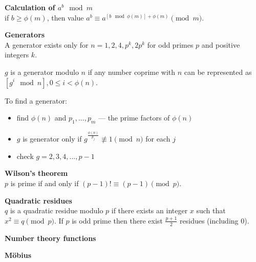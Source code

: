 \textbf{Calculation of $a^b \mod m$}\\
if $b \ge \phi(m)$, then value $a^b \equiv a^{\left[b \mod \phi(m)\right] + \phi(m)} \pmod m$.

\textbf{Generators}\\
A generator exists only for $n = 1, 2, 4, p^k, 2p^k$ for odd primes $p$ and positive integers $k$. 

$g$ is a generator modulo $n$ if any number coprime with $n$ can be represented as $\left[ g^i \mod n \right], 0 \le i < \phi(n)$.

To find a generator:
\begin{itemize}
\item find $\phi(n)$ and $p_1, ..., p_m$ --- the prime factors of $\phi(n)$
\item $g$ is generator only if $g^{\frac{\phi(n)}{p_j}} \not\equiv 1 \pmod n$ for each $j$
\item check $g = 2, 3, 4, ..., p - 1$
\end{itemize}

\textbf{Wilson's theorem}\\
$p$ is prime if and only if $(p - 1)! \equiv (p - 1) \pmod p$.

\textbf{Quadratic residues}\\
$q$ is a quadratic residue modulo $p$ if there exists an integer $x$ such that $x^2 \equiv q \pmod p$.
If $p$ is odd prime then there exist $\frac{p + 1}{2}$ residues (including 0).

\textbf{Number theory functions}

\textbf{Möbius}
